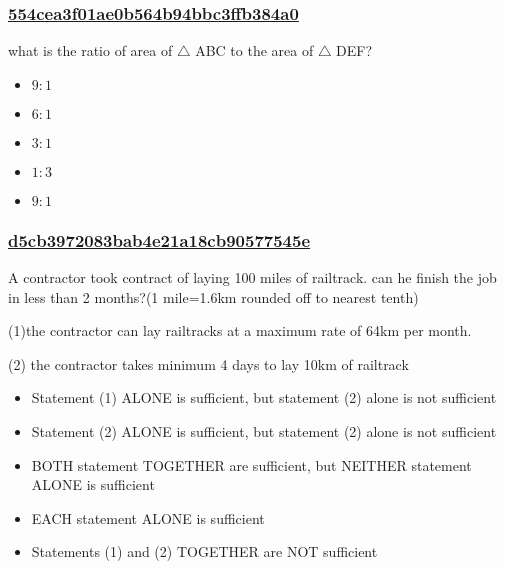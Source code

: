 \documentclass[]{beamer}
\begin{document}
\begin{frame}
    \frametitle{\underline{554cea3f01ae0b564b94bbc3ffb384a0}}
    what is the ratio of area of $\bigtriangleup$ ABC to the area of $\bigtriangleup$ DEF?
    \begin{itemize}
        \item
            $9:1$
        \item
            $6:1$
        \item
            $3:1$
        \item
            $1:3$
        \item
            $9:1$
    \end{itemize}
\end{frame}
\begin{frame}
    \frametitle{\underline{d5cb3972083bab4e21a18cb90577545e}}
    A contractor took contract of laying 100 miles of railtrack. can he finish the job in less than 2 months?(1 mile=1.6km rounded off to nearest tenth)\par
(1)the contractor can lay railtracks at a maximum rate of 64km per month.\par
(2) the contractor takes minimum 4 days to lay 10km of railtrack
    \begin{itemize}
        \item
            Statement (1) ALONE is sufficient, but statement (2) alone is not sufficient
        \item
            Statement (2) ALONE is sufficient, but statement (2) alone is not sufficient
        \item
            BOTH statement TOGETHER are sufficient, but NEITHER statement ALONE is sufficient
        \item
            EACH statement ALONE is sufficient
        \item
            Statements (1) and (2) TOGETHER are NOT sufficient
    \end{itemize}
\end{frame}
\end{document}
